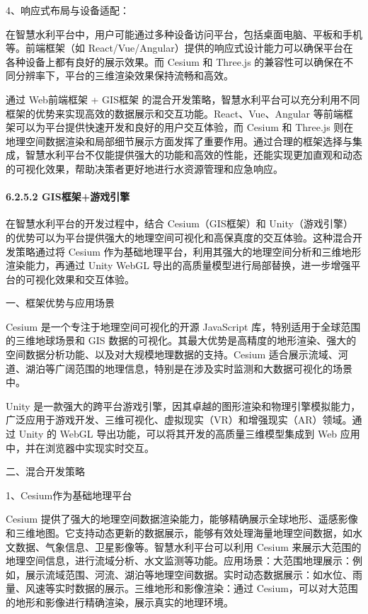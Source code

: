 4、响应式布局与设备适配：

在智慧水利平台中，用户可能通过多种设备访问平台，包括桌面电脑、平板和手机等。前端框架（如 React/Vue/Angular）提供的响应式设计能力可以确保平台在各种设备上都有良好的展示效果。而 Cesium 和 Three.js 的兼容性可以确保在不同分辨率下，平台的三维渲染效果保持流畅和高效。

通过 Web前端框架 + GIS框架 的混合开发策略，智慧水利平台可以充分利用不同框架的优势来实现高效的数据展示和交互功能。React、Vue、Angular 等前端框架可以为平台提供快速开发和良好的用户交互体验，而 Cesium 和 Three.js 则在地理空间数据渲染和局部细节展示方面发挥了重要作用。通过合理的框架选择与集成，智慧水利平台不仅能提供强大的功能和高效的性能，还能实现更加直观和动态的可视化效果，帮助决策者更好地进行水资源管理和应急响应。

\hypertarget{gisux6846ux67b6ux6e38ux620fux5f15ux64ce}{%
\paragraph{6.2.5.2 GIS框架+游戏引擎}\label{gisux6846ux67b6ux6e38ux620fux5f15ux64ce}}

在智慧水利平台的开发过程中，结合 Cesium（GIS框架）和 Unity（游戏引擎）的优势可以为平台提供强大的地理空间可视化和高保真度的交互体验。这种混合开发策略通过将 Cesium 作为基础地理平台，利用其强大的地理空间分析和三维地形渲染能力，再通过 Unity WebGL 导出的高质量模型进行局部替换，进一步增强平台的可视化效果和交互体验。

一、框架优势与应用场景

Cesium 是一个专注于地理空间可视化的开源 JavaScript 库，特别适用于全球范围的三维地球场景和 GIS 数据的可视化。其最大优势是高精度的地形渲染、强大的空间数据分析功能、以及对大规模地理数据的支持。Cesium 适合展示流域、河道、湖泊等广阔范围的地理信息，特别是在涉及实时监测和大数据可视化的场景中。

Unity 是一款强大的跨平台游戏引擎，因其卓越的图形渲染和物理引擎模拟能力，广泛应用于游戏开发、三维可视化、虚拟现实（VR）和增强现实（AR）领域。通过 Unity 的 WebGL 导出功能，可以将其开发的高质量三维模型集成到 Web 应用中，并在浏览器中实现实时交互。

二、混合开发策略

1、Cesium作为基础地理平台

Cesium 提供了强大的地理空间数据渲染能力，能够精确展示全球地形、遥感影像和三维地图。它支持动态更新的数据展示，能够有效处理海量地理空间数据，如水文数据、气象信息、卫星影像等。智慧水利平台可以利用 Cesium 来展示大范围的地理空间信息，进行流域分析、水文监测等功能。应用场景：大范围地理展示：例如，展示流域范围、河流、湖泊等地理空间数据。实时动态数据展示：如水位、雨量、风速等实时数据的展示。三维地形和影像渲染：通过 Cesium，可以对大范围的地形和影像进行精确渲染，展示真实的地理环境。

